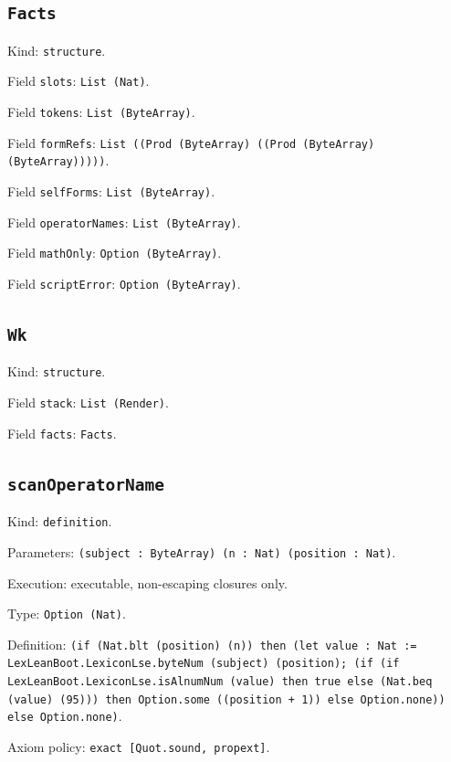 \documentclass[11pt]{article}
\begin{document}
\subsection*{\texttt{Facts}}
\noindent Kind: \texttt{structure}.\par
\noindent Field \texttt{slots}: \texttt{List (Nat)}.\par
\noindent Field \texttt{tokens}: \texttt{List (ByteArray)}.\par
\noindent Field \texttt{formRefs}: \texttt{List ((Prod (ByteArray) ((Prod (ByteArray) (ByteArray)))))}.\par
\noindent Field \texttt{selfForms}: \texttt{List (ByteArray)}.\par
\noindent Field \texttt{operatorNames}: \texttt{List (ByteArray)}.\par
\noindent Field \texttt{mathOnly}: \texttt{Option (ByteArray)}.\par
\noindent Field \texttt{scriptError}: \texttt{Option (ByteArray)}.\par
\subsection*{\texttt{Wk}}
\noindent Kind: \texttt{structure}.\par
\noindent Field \texttt{stack}: \texttt{List (Render)}.\par
\noindent Field \texttt{facts}: \texttt{Facts}.\par
\subsection*{\texttt{scanOperatorName}}
\noindent Kind: \texttt{definition}.\par
\noindent Parameters: \texttt{(subject : ByteArray) (n : Nat) (position : Nat)}.\par
\noindent Execution: executable, non-escaping closures only.\par
\noindent Type: \texttt{Option (Nat)}.\par
\noindent Definition: \texttt{(if (Nat.blt (position) (n)) then (let value : Nat := LexLeanBoot.LexiconLse.byteNum (subject) (position); (if (if LexLeanBoot.LexiconLse.isAlnumNum (value) then true else (Nat.beq (value) (95))) then Option.some ((position + 1)) else Option.none)) else Option.none)}.\par
\noindent Axiom policy: \texttt{exact [Quot.sound, propext]}.\par
\end{document}
